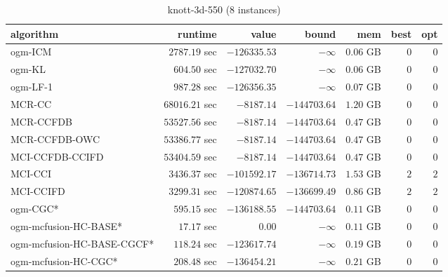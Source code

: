 \begin{table}[H]
\scriptsize
\centering
\caption{knott-3d-550 (8 instances)}
\label{tab:smalltable-knott-3d-550}
\begin{tabular}{lrrrrrr}
\toprule
           algorithm &       runtime     &         value &         bound &           mem &     best &      opt   \\ \midrule 
             ogm-ICM & $      2787.19$ sec & $   -126335.53$ & $-\infty$ & $         0.06$ GB & $       0$ & $       0$ \\ 
              ogm-KL & $       604.50$ sec & $   -127032.70$ & $-\infty$ & $         0.06$ GB & $       0$ & $       0$ \\ 
            ogm-LF-1 & $       987.28$ sec & $   -126356.35$ & $-\infty$ & $         0.07$ GB & $       0$ & $       0$ \\ 
\cmidrule{1-1} 
              MCR-CC & $     68016.21$ sec & $     -8187.14$ & $   -144703.64$ & $         1.20$ GB & $       0$ & $       0$ \\ 
           MCR-CCFDB & $     53527.56$ sec & $     -8187.14$ & $   -144703.64$ & $         0.47$ GB & $       0$ & $       0$ \\ 
       MCR-CCFDB-OWC & $     53386.77$ sec & $     -8187.14$ & $   -144703.64$ & $         0.47$ GB & $       0$ & $       0$ \\ 
\cmidrule{1-1} 
     MCI-CCFDB-CCIFD & $     53404.59$ sec & $     -8187.14$ & $   -144703.64$ & $         0.47$ GB & $       0$ & $       0$ \\ 
             MCI-CCI & $      3436.37$ sec & $   -101592.17$ & $   -136714.73$ & $         1.53$ GB & $       2$ & $       2$ \\ 
           MCI-CCIFD & $      3299.31$ sec & $   -120874.65$ & $   -136699.49$ & $         0.86$ GB & $       2$ & $       2$ \\ 
\cmidrule{1-1} 
            ogm-CGC* & $       595.15$ sec & $   -136188.55$ & $   -144703.64$ & $         0.11$ GB & $       0$ & $       0$ \\ 
ogm-mcfusion-HC-BASE* & $        17.17$ sec & $         0.00$ & $-\infty$ & $         0.11$ GB & $       0$ & $       0$ \\ 
ogm-mcfusion-HC-BASE-CGCF* & $       118.24$ sec & $   -123617.74$ & $-\infty$ & $         0.19$ GB & $       0$ & $       0$ \\ 
ogm-mcfusion-HC-CGC* & $       208.48$ sec & $   -136454.21$ & $-\infty$ & $         0.21$ GB & $       0$ & $       0$ \\ 

\end{tabular}
\end{table}
